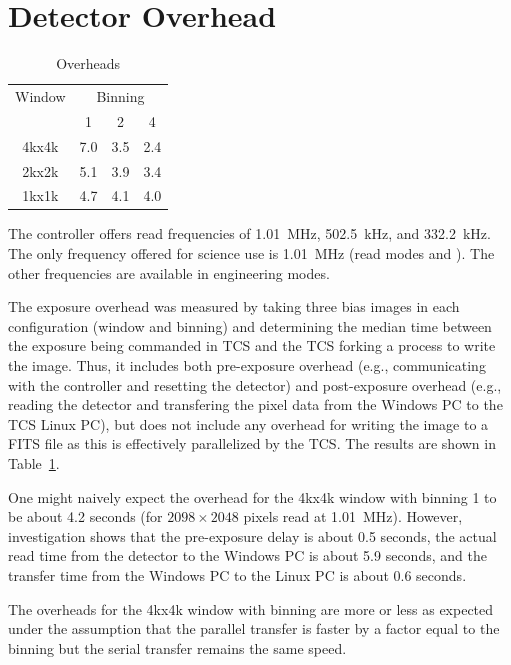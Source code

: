 \documentclass{article}
\newcommand{\code}[1]{{\ttfamily #1}}
\begin{document}
\section{Detector Overhead}

\begin{table}
\caption{Overheads}
\label{table:overheads}
\begin{center}
\begin{tabular}{cccc}
\hline
Window&\multicolumn{3}{c}{Binning}\\
&1&2&4\\
\hline
\code{4kx4k}&7.0&3.5&2.4\\
\code{2kx2k}&5.1&3.9&3.4\\
\code{1kx1k}&4.7&4.1&4.0\\
\hline
\end{tabular}
\end{center}
\end{table}

The controller offers read frequencies of 1.01~MHz, 502.5~kHz, and 332.2~kHz. The only frequency offered for science use is 1.01~MHz (read modes \code{0} and \code{1}). The other frequencies are available in engineering modes.

The exposure overhead was measured by taking three bias images in each configuration (window and binning) and determining the median time between the exposure being commanded in TCS and the TCS forking a process to write the image. Thus, it includes both pre-exposure overhead (e.g., communicating with the controller and resetting the detector) and post-exposure overhead (e.g., reading the detector and transfering the pixel data from the Windows PC to the TCS Linux PC), but does not include any overhead for writing the image to a FITS file as this is effectively parallelized by the TCS. The results are shown in Table~\ref{table:overheads}.

One might naively expect the overhead for the \code{4kx4k} window with binning 1 to be about 4.2 seconds (for $2098 \times 2048$ pixels read at 1.01~MHz). However, investigation shows that the pre-exposure delay is about 0.5 seconds, the actual read time from the detector to the Windows PC is about 5.9 seconds, and the transfer time from the Windows PC to the Linux PC is about 0.6 seconds.

The overheads for the \code{4kx4k} window with binning are more or less as expected under the assumption that the parallel transfer is faster by a factor equal to the binning but the serial transfer remains the same speed.
\end{document}
